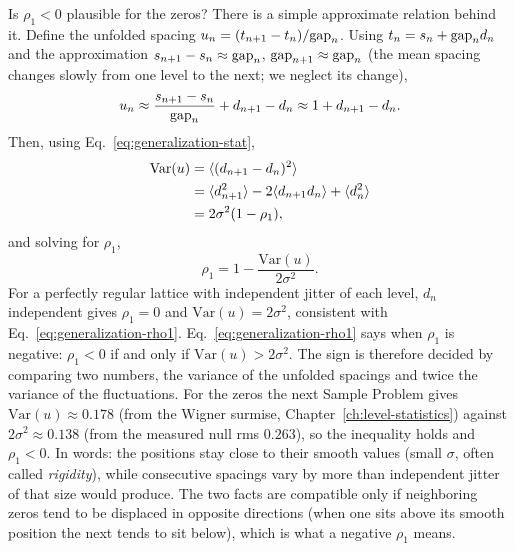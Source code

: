 Is $\rho_1<0$ plausible for the zeros? There is a simple approximate relation behind it. Define the unfolded spacing $u_n=(t_{n+1}-t_n)/\mathrm{gap}_n$. Using $t_n=s_n+\mathrm{gap}_n d_n$ and the approximation $s_{n+1}-s_n\approx\mathrm{gap}_n$, $\mathrm{gap}_{n+1}\approx\mathrm{gap}_n$ (the mean spacing changes slowly from one level to the next; we neglect its change),
\begin{equation}
u_n\approx\frac{s_{n+1}-s_n}{\mathrm{gap}_n}+d_{n+1}-d_n\approx1+d_{n+1}-d_n.
\label{eq:generalization-un}
\end{equation}
Then, using Eq.~\eqref{eq:generalization-stat},
\begin{align}
\mathrm{Var}(u)&=\langle(d_{n+1}-d_n)^2\rangle\notag\\
&=\langle d_{n+1}^2\rangle-2\langle d_{n+1}d_n\rangle+\langle d_n^2\rangle\notag\\
&=2\sigma^2(1-\rho_1),
\end{align}
and solving for $\rho_1$,
\begin{equation}
\rho_1=1-\frac{\mathrm{Var}(u)}{2\sigma^2}.
\label{eq:generalization-rho1}
\end{equation}
For a perfectly regular lattice with independent jitter of each level, $d_n$ independent gives $\rho_1=0$ and $\mathrm{Var}(u)=2\sigma^2$, consistent with Eq.~\eqref{eq:generalization-rho1}. Eq.~\eqref{eq:generalization-rho1} says when $\rho_1$ is negative: $\rho_1<0$ if and only if $\mathrm{Var}(u)>2\sigma^2$. The sign is therefore decided by comparing two numbers, the variance of the unfolded spacings and twice the variance of the fluctuations. For the zeros the next Sample Problem gives $\mathrm{Var}(u)\approx0.178$ (from the Wigner surmise, Chapter~\ref{ch:level-statistics}) against $2\sigma^2\approx0.138$ (from the measured null rms $0.263$), so the inequality holds and $\rho_1<0$. In words: the positions stay close to their smooth values (small $\sigma$, often called \emph{rigidity}), while consecutive spacings vary by more than independent jitter of that size would produce. The two facts are compatible only if neighboring zeros tend to be displaced in opposite directions (when one sits above its smooth position the next tends to sit below), which is what a negative $\rho_1$ means.

